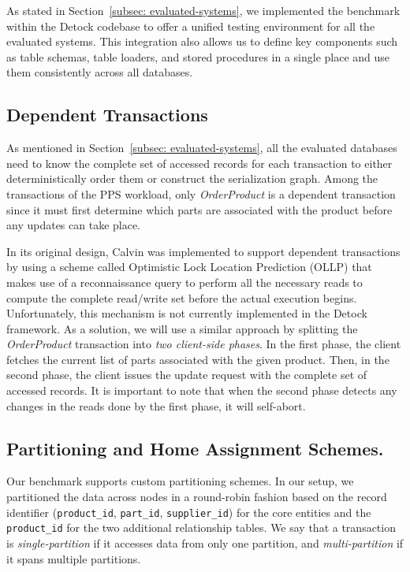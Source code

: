 As stated in Section~\ref{subsec: evaluated-systems}, we implemented the benchmark within the Detock codebase to offer a unified testing environment for all the evaluated systems. This integration also allows us to define key components such as table schemas, table loaders, and stored procedures in a single place and use them consistently across all databases.

\subsection{Dependent Transactions}
\label{subsec: dependent-transactions}
As mentioned in Section~\ref{subsec: evaluated-systems}, all the evaluated databases need to know the complete set of accessed records for each transaction to either deterministically order them or construct the serialization graph. Among the transactions of the PPS workload, only \textit{OrderProduct} is a dependent transaction since it must first determine which parts are associated with the product before any updates can take place.

In its original design, Calvin was implemented to support dependent transactions by using a scheme called Optimistic Lock Location Prediction (OLLP) that makes use of a reconnaissance query to perform all the necessary reads to compute the complete read/write set before the actual execution begins. Unfortunately, this mechanism is not currently implemented in the Detock framework. As a solution, we will use a similar approach by splitting the \textit{OrderProduct} transaction into \textit{two client-side phases}. In the first phase, the client fetches the current list of parts associated with the given product. Then, in the second phase, the client issues the update request with the complete set of accessed records. It is important to note that when the second phase detects any changes in the reads done by the first phase, it will self-abort.

\subsection{Partitioning and Home Assignment Schemes.}
\label{subsec: partitioning-and-home-assignment-schemes}
Our benchmark supports custom partitioning schemes. In our setup, we partitioned the data across nodes in a round-robin fashion based on the record identifier (\texttt{product\_id}, \texttt{part\_id}, \texttt{supplier\_id}) for the core entities and the \texttt{product\_id} for the two additional relationship tables. We say that a transaction is \textit{single-partition} if it accesses data from only one partition, and \textit{multi-partition} if it spans multiple partitions.

